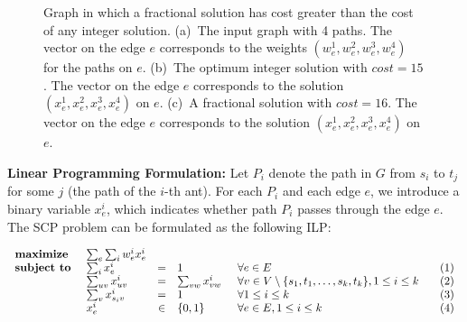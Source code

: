 \documentclass{llncs}
\newcommand{\SCoP}{\textsc{SCP}}
\begin{document}
\begin{figure}[t]
\center
\hfill
\hfill
    \caption{Graph in which a fractional solution has cost greater
    than the cost of any integer solution.
    (a)~The input graph with 4 paths. The vector on the edge $e$
    corresponds to the weights $(w_e^1, w_e^2, w_e^3, w_e^4)$ for the
    paths on $e$.
    (b)~The optimum integer solution with $cost=15$.
    The vector on the edge $e$ corresponds to the solution
    $(x_e^1,x_e^2, x_e^3, x_e^4)$ on $e$.
    (c)~A fractional solution with $cost=16$.
    The vector on the edge $e$ corresponds to the solution
    $(x_e^1,x_e^2, x_e^3, x_e^4)$ on $e$.}
    \label{fig:noninteger}
\end{figure}

{\bf Linear Programming Formulation:}
Let $P_i$ denote the path in $G$ from $s_i$ to $t_j$ for some $j$ (the
path of the $i$-th ant).
For each $P_i$ and each edge $e$, we introduce a binary variable
$x_e^i$, which indicates whether
path $P_i$ passes through the edge $e$. The \SCoP{} problem can be
formulated as the following ILP:

$$
\begin{array}{llcllr}
\mbox{\textbf{maximize}}\:\: & \sum_e \sum_i w_e^i x_e^i \\
\mbox{\textbf{subject to }} & \sum_i x_e^i        &=&  1  & \forall
e\in E & \:\:\:\:(1)\\
& \sum_{uv} x_{uv}^i  &=&  \sum_{vw} x_{vw}^i \:\:& \forall v \in V \setminus \{s_1,t_1,\ldots, s_k,t_k\},
1\le i \le k & (2)\\
& \sum_{v} x_{s_iv}^i &=&  1 & \forall 1\le i \le k & (3) \\
& x_e^i & \in & \{0,1\} & \forall e\in E, 1\le i \le k & (4)
\end{array}
$$
\end{document}
